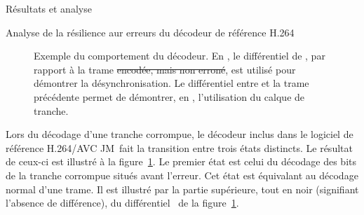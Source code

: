 \documentclass[letterpaper, twoside, 12pt,memoire]{thETS}
\newcommand{\ltCodec}{logiciel de référence H.264/AVC JM}
\newcommand{\fig}[1]{figure~\ref{#1}}
\providecommand{\DIFadd}[1]{{\protect\color{blue}\uwave{#1}}} %
\providecommand{\DIFdel}[1]{{\protect\color{red}\sout{#1}}}                      %
\providecommand{\DIFaddFL}[1]{\DIFadd{#1}} %
\providecommand{\DIFdelFL}[1]{\DIFdel{#1}} %
\providecommand{\DIFaddbeginFL}{} %
\providecommand{\DIFaddendFL}{} %
\providecommand{\DIFdelbeginFL}{} %
\providecommand{\DIFdelendFL}{} %
\begin{document}
\begin{chapter}{Résultats et analyse}
\begin{section}{Analyse de la résilience aur erreurs du décodeur de référence H.264}
\begin{figure}[htb]
\caption{Exemple du comportement du décodeur. En , le
différentiel de , par rapport à la trame
\DIFdelbeginFL \DIFdelFL{encodée, mais non erroné}\DIFdelendFL \DIFaddbeginFL \DIFaddFL{codée/décodée sans erreur}\DIFaddendFL , est utilisé pour démontrer la désynchronisation. Le
différentiel entre  et la trame précédente permet de démontrer, en
, l'utilisation du calque de tranche.}
\label{fig-DecoderBehavior}
\end{figure}

Lors du décodage d'une tranche corrompue, le décodeur inclus dans le
\ltCodec~fait la transition entre trois états distincts. Le résultat de ceux-ci
est illustré à la \fig{fig-DecoderBehavior}. Le premier état est celui du
décodage des bits de la tranche corrompue situés avant l'erreur. Cet état est
équivalant au décodage normal d'une trame. Il est illustré par la partie
supérieure, tout en noir (signifiant l'absence de différence), du
différentiel~ de la \fig{fig-DecoderBehavior}.


\end{section}
\end{chapter}
\end{document}
